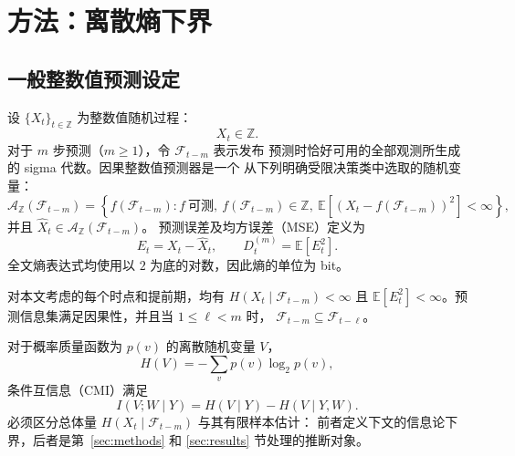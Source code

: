 \section{方法：离散熵下界}
\label{sec:theory}

\subsection{一般整数值预测设定}
\label{subsec:notation}

设 \(\{X_t\}_{t\in\mathbb{Z}}\) 为整数值随机过程：
\begin{equation}
X_t\in\mathbb{Z}.
\label{eq:general_integer_process}
\end{equation}
对于 \(m\) 步预测（\(m\geq1\)），令 \(\mathcal{F}_{t-m}\) 表示发布
预测时恰好可用的全部观测所生成的 sigma 代数。因果整数值预测器是一个
从下列明确受限决策类中选取的随机变量：
\begin{equation}
\mathcal A_{\mathbb Z}(\mathcal F_{t-m})
=
\left\{
f(\mathcal F_{t-m}):
f\ \text{可测},\
f(\mathcal F_{t-m})\in\mathbb Z,\
\mathbb E[(X_t-f(\mathcal F_{t-m}))^2]<\infty
\right\},
\label{eq:general_predictor}
\end{equation}
并且 \(\widehat X_t\in\mathcal A_{\mathbb Z}(\mathcal F_{t-m})\)。
预测误差及均方误差（MSE）定义为
\begin{equation}
E_t=X_t-\widehat X_t,
\qquad
D_t^{(m)}=\mathbb{E}[E_t^2].
\label{eq:general_error_mse}
\end{equation}
全文熵表达式均使用以 \(2\) 为底的对数，因此熵的单位为 bit。

\begin{Assumption}
\label{ass:general_regularity}
对本文考虑的每个时点和提前期，均有
\(H(X_t\mid\mathcal{F}_{t-m})<\infty\) 且
\(\mathbb{E}[E_t^2]<\infty\)。预测信息集满足因果性，并且当
\(1\leq\ell<m\) 时，
\(\mathcal{F}_{t-m}\subseteq\mathcal{F}_{t-\ell}\)。
\end{Assumption}

对于概率质量函数为 \(p(v)\) 的离散随机变量 \(V\)，
\begin{equation}
H(V)=-\sum_vp(v)\log_2p(v),
\label{eq:shannon_entropy}
\end{equation}
条件互信息（CMI）满足
\begin{equation}
I(V;W\mid Y)=H(V\mid Y)-H(V\mid Y,W).
\label{eq:cmi_definition}
\end{equation}
必须区分总体量 \(H(X_t\mid\mathcal F_{t-m})\) 与其有限样本估计：
前者定义下文的信息论下界，后者是第~\ref{sec:methods} 和
\ref{sec:results} 节处理的推断对象。

